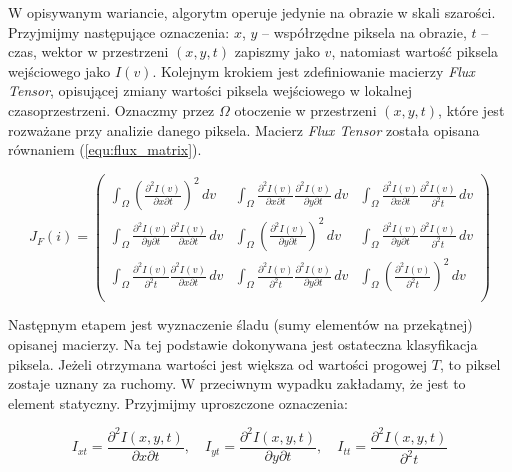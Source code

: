 W opisywanym wariancie, algorytm operuje jedynie na obrazie w skali szarości. Przyjmijmy następujące oznaczenia: $x$, $y$ -- współrzędne piksela na obrazie, $t$ -- czas, wektor w przestrzeni $(x,y,t)$ zapiszmy jako $v$, natomiast wartość piksela wejściowego jako $I(v)$. Kolejnym krokiem jest zdefiniowanie macierzy \textit{Flux Tensor}, opisującej zmiany wartości piksela wejściowego w lokalnej czasoprzestrzeni. Oznaczmy przez $\Omega$ otoczenie w przestrzeni $(x,y,t)$, które jest rozważane przy analizie danego piksela. Macierz \textit{Flux Tensor} została opisana równaniem (\ref{equ:flux_matrix}).

\begin{equation}
			J_F(i) = 
			\begin{pmatrix}
			\int_\Omega \left(\frac{\partial^2 I(v)}{\partial x\partial t}\right)^2\,dv & 
			\int_\Omega \frac{\partial^2 I(v)}{\partial x\partial t}\frac{\partial^2 I(v)}{\partial y 							\partial t}\,dv & 
			\int_\Omega \frac{\partial^2 I(v)}{\partial x\partial t}\frac{\partial^2 I(v)}{\partial^2 t}						\,dv	\\
			
			\int_\Omega \frac{\partial^2 I(v)}{\partial y\partial t}\frac{\partial^2 I(v)}{\partial x 							\partial t}\,dv & 
			\int_\Omega \left(\frac{\partial^2 I(v)}{\partial y\partial t}\right)^2\,dv & 
			\int_\Omega \frac{\partial^2 I(v)}{\partial y\partial t}\frac{\partial^2 I(v)}{\partial^2 t}						\,dv \\
			
			\int_\Omega \frac{\partial^2 I(v)}{\partial^2 t}\frac{\partial^2 I(v)}{\partial x\partial t}						\,dv & 
			\int_\Omega \frac{\partial^2 I(v)}{\partial^2 t}\frac{\partial^2 I(v)}{\partial y\partial t}						\,dv & 
			\int_\Omega \left(\frac{\partial^2 I(v)}{\partial^2 t}\right)^2\,dv \\		
			\end{pmatrix}
\label{equ:flux_matrix}
\end{equation}

Następnym etapem jest wyznaczenie śladu (sumy elementów na przekątnej) opisanej macierzy. Na tej podstawie dokonywana jest ostateczna klasyfikacja piksela. Jeżeli otrzymana wartości jest większa od wartości progowej $T$, to piksel zostaje uznany za ruchomy. W przeciwnym wypadku zakładamy, że jest to element statyczny. Przyjmijmy uproszczone oznaczenia:

\begin{equation}
	I_{xt}=\frac{\partial^2I(x,y,t)}{\partial x\partial t},\quad I_{yt}=\frac{\partial^2I(x,y,t)}{\partial y			\partial t},\quad I_{tt}=\frac{\partial^2I(x,y,t)}{\partial^2 t}	
\label{equ:flux_components}
\end{equation}

